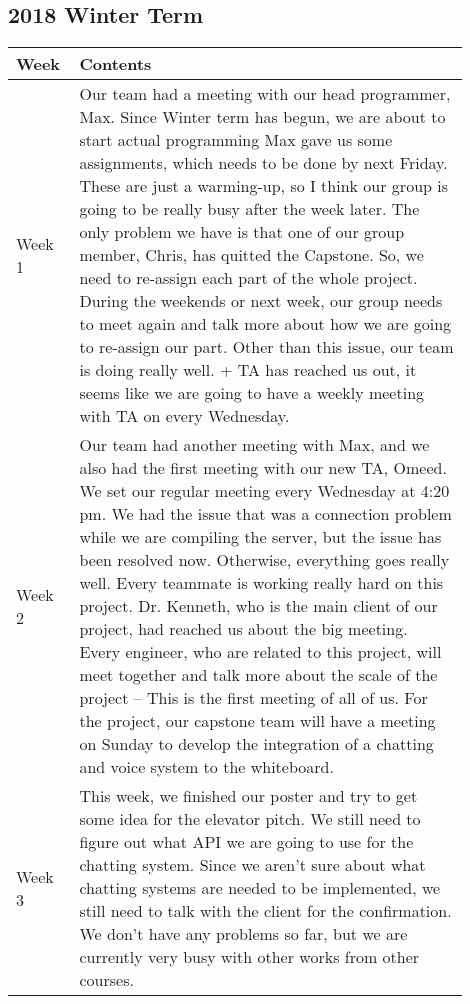 \documentclass[10pt]{article}
\begin{document}
    \subsection{2018 Winter Term}
        \begin{center}
        \begin{tabular}{ | p{0.1\linewidth} | p{0.8\linewidth} | } \hline
            Week & Contents  \\ \hline  
            Week 1 &  Our team had a meeting with our head programmer, Max. Since Winter term has begun, we are about to start actual programming
            Max gave us some assignments, which needs to be done by next Friday. 
            These are just a warming-up, so I think our group is going to be really busy after the week later.
            The only problem we have is that one of our group member, Chris, has quitted the Capstone. 
            So, we need to re-assign each part of the whole project. 
            During the weekends or next week, our group needs to meet again and talk more about how we are going to re-assign our part.
            Other than this issue, our team is doing really well. 
            + TA has reached us out, it seems like we are going to have a weekly meeting with TA on every Wednesday.  \\ \hline
            Week 2 &  Our team had another meeting with Max, and we also had the first meeting with our new TA, Omeed.
            We set our regular meeting every Wednesday at 4:20 pm.
            We had the issue that was a connection problem while we are compiling the server, but the issue has been resolved now.
            Otherwise, everything goes really well. Every teammate is working really hard on this project.
            Dr. Kenneth, who is the main client of our project, had reached us about the big meeting.
            Every engineer, who are related to this project, will meet together and talk more about the scale of the project -- This is the first meeting of all of us.
            For the project, our capstone team will have a meeting on Sunday to develop the integration of a chatting and voice system to the whiteboard.
             \\ \hline
            Week 3 &  This week, we finished our poster and try to get some idea for the elevator pitch.
            We still need to figure out what API we are going to use for the chatting system.
            Since we aren't sure about what chatting systems are needed to be implemented, we still need to talk with the client for the confirmation.
            We don't have any problems so far, but we are currently very busy with other works from other courses.

\end{tabular}
\end{center}
\end{document}
